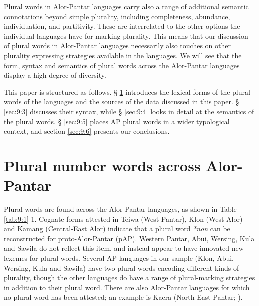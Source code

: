  Plural words in Alor-Pantar languages carry also a range of additional semantic connotations beyond simple plurality, including completeness, abundance, individuation, and partitivity. These are interrelated to the other options the individual languages have for marking plurality. This means that our discussion of plural words in Alor-Pantar languages necessarily also touches on other plurality expressing strategies available in the languages. We will see that the form, syntax and semantics of plural words across the Alor-Pantar languages display a high degree of diversity.

This paper is structured as follows. {\S} \ref{sec:9:2} introduces the lexical forms of the plural words of the languages and the sources of the data discussed in this paper. {\S} \ref{sec:9:3} discusses their syntax, while {\S} \ref{sec:9:4} looks in detail at the semantics of the plural words. {\S} \ref{sec:9:5} places AP plural words in a wider typological context, and section \ref{sec:9:6} presents our conclusions.

\section{Plural number words across Alor-Pantar}  %
\label{sec:9:2}
Plural words are found across the Alor-Pantar languages, as shown in Table \ref{tab:9:1} 1. Cognate forms attested in Teiwa (West Pantar), Klon (West Alor) and Kamang (Central-East Alor) indicate that a plural word \textit{*non} can be reconstructed for proto-Alor-Pantar (pAP). Western Pantar, Abui, Wersing, Kula and Sawila do not reflect this item, and instead appear to have innovated new lexemes for plural words. Several AP languages in our sample (Klon, Abui, Wersing, Kula and Sawila) have two plural words encoding different kinds of plurality, though the other languages do have a range of plural-marking strategies in addition to their plural word. There are also Alor-Pantar languages for which no plural word has been attested; an example is Kaera (North-East Pantar; \citealt{Klamerta}).




